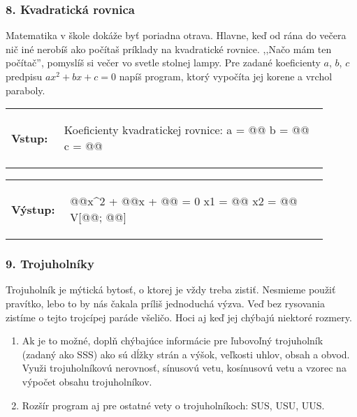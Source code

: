 \subsubsection*{8. Kvadratická rovnica}
Matematika v škole dokáže byť poriadna otrava. Hlavne, keď od rána do večera nič iné nerobíš ako počítaš príklady na kvadratické rovnice. ,,Načo mám ten počítač'', pomyslíš si večer vo svetle stolnej lampy. Pre zadané koeficienty $a$, $b$, $c$ predpisu $ax^2 + bx + c = 0$ napíš program, ktorý vypočíta jej korene a vrchol paraboly.

\begin{tabular}{@{}p{0.15\linewidth}p{0.75\linewidth}}
\textbf{\small Vstup:} &
\vspace{-3em}
\begin{code}
Koeficienty kvadratickej rovnice:
a = @\fbox{\phantom{vstup}}@
b = @\fbox{\phantom{vstup}}@
c = @\fbox{\phantom{vstup}}@
\end{code}
\end{tabular}

\vspace{-2em}
\begin{tabular}{@{}p{0.15\linewidth}p{0.75\linewidth}}
\textbf{\small Výstup:} &
\vspace{-3em}
\begin{code}
@\fbox{\phantom{a}}@x^2 + @\fbox{\phantom{b}}@x + @\fbox{\phantom{c}}@ = 0
x1 = @\fbox{\phantom{abc}}@
x2 = @\fbox{\phantom{abc}}@
V[@\fbox{\phantom{abc}}@; @\fbox{\phantom{abc}}@]
\end{code}
\end{tabular}
\vspace{-2em}


\subsubsection*{9. Trojuholníky}
Trojuholník je mýtická bytosť, o ktorej je vždy treba zistiť. Nesmieme použiť pravítko, lebo to by nás čakala príliš jednoduchá výzva. Veď bez rysovania zistíme o tejto trojcípej paráde všeličo. Hoci aj keď jej chýbajú niektoré rozmery.

\begin{enumerate}[label=\alph*)]
\item Ak je to možné, doplň chýbajúce informácie pre ľubovoľný trojuholník (zadaný ako SSS) ako sú dĺžky strán a výšok, veľkosti uhlov, obsah a obvod. Využi trojuholníkovú nerovnosť, sínusovú vetu, kosínusovú vetu a vzorec na výpočet obsahu trojuholníkov.
\item Rozšír program aj pre ostatné vety o trojuholníkoch: SUS, USU, UUS.
\end{enumerate}

